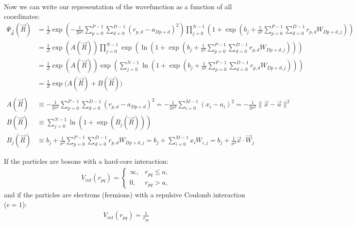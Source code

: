 \documentclass[12pt]{article}
\begin{document}
\noindent Now we can write our representation of the wavefunction as a function of all coordinates:
\begin{align*}
\Psi_{\vec{\theta}}(\vec{R}) &=\frac{1}{Z} \exp \left( -\frac{1}{2\sigma^2} \sum_{p=0}^{P-1}\sum_{d=0}^{D-1} (r_{p,d} - a_{Dp+d})^2 \right) \prod_{j=0}^{N-1} \left( 1 + \exp \left( b_j + \frac{1}{ \sigma^2} \sum_{p=0}^{P-1}\sum_{d=0}^{D-1} r_{p,d} W_{Dp+d,j} \right) \right)\\
&=\frac{1}{Z} \exp (A(\vec{R})) \prod_{j=0}^{N-1} \exp\left( \ln \left(  1 + \exp \left( b_j + \frac{1}{ \sigma^2} \sum_{p=0}^{P-1}\sum_{d=0}^{D-1} r_{p,d} W_{Dp+d,j} \right) \right) \right) \\
&=\frac{1}{Z} \exp (A(\vec{R})) \exp \left( \sum_{j=0}^{N-1} \ln \left(  1 + \exp \left( b_j + \frac{1}{ \sigma^2} \sum_{p=0}^{P-1}\sum_{d=0}^{D-1} r_{p,d} W_{Dp+d,j} \right) \right) \right) \\
&= \frac{1}{Z} \exp  \Big( A(\vec{R})+ B(\vec{R}) \Big) \\ \\
A(\vec{R}) &\equiv -\frac{1}{2\sigma^2} \sum_{p=0}^{P-1}\sum_{d=0}^{D-1} (r_{p,d} - a_{Dp+d})^2 = - \frac{1}{2\sigma^2}\sum_{i=0}^{M-1} (x_i-a_i)^2 = -\frac{1}{2\sigma^2} \| \vec{x} - \vec{a} \|^2\\
B(\vec{R}) &\equiv \sum_{j=0}^{N-1} \ln \left(  1 + \exp \left( B_j (\vec{R}) \right) \right)\\
B_j(\vec{R}) &\equiv b_j + \frac{1}{ \sigma^2}\sum_{p=0}^{P-1}\sum_{d=0}^{D-1} r_{p,d} W_{Dp+d,j} = b_j + \sum_{i=0}^{M-1} x_i W_{i,j} = b_j + \frac{1}{ \sigma^2} \vec{x}\cdot \vec{W}_j
\end{align*}

\noindent If the particles are bosons with a hard-core interaction:
\begin{align*}
V_{int} (r_{pq}) = 
\begin{cases} 
	\infty, & r_{pq} \leq a,\\
	0, & r_{pq} > a,
   \end{cases}
\end{align*}
and if the particles are electrons (fermions) with a repulsive Coulomb interaction ($e=1$):
\begin{align*}
V_{int} (r_{pq}) = \frac{1}{r_{pq}}
\end{align*}
\end{document}
